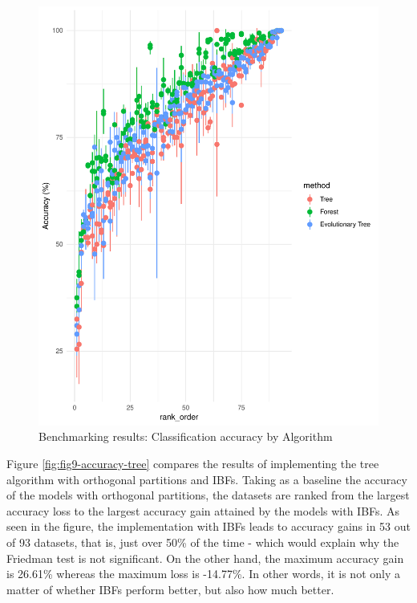 \documentclass[]{elsarticle} %
\makeatletter
\def\maxwidth{\ifdim\Gin@nat@width>\linewidth\linewidth
\else\Gin@nat@width\fi}
\let\Oldincludegraphics\includegraphics
\renewcommand{\includegraphics}[1]{\Oldincludegraphics[width=\maxwidth]{#1}}
\makeatother
\begin{document}
\begin{figure}
\centering
\includegraphics{Trees_with_Base_Functions_v3_files/figure-latex/fig8-performance-algorithm-results-1.pdf}
\caption{\label{fig:fig8-performance-algorithm-results}Benchmarking
results: Classification accuracy by Algorithm}
\end{figure}

Figure \ref{fig:fig9-accuracy-tree} compares the results of implementing
the tree algorithm with orthogonal partitions and IBFs. Taking as a
baseline the accuracy of the models with orthogonal partitions, the
datasets are ranked from the largest accuracy loss to the largest
accuracy gain attained by the models with IBFs. As seen in the figure,
the implementation with IBFs leads to accuracy gains in 53 out of 93
datasets, that is, just over 50\% of the time - which would explain why
the Friedman test is not significant. On the other hand, the maximum
accuracy gain is 26.61\% whereas the maximum loss is -14.77\%. In other
words, it is not only a matter of whether IBFs perform better, but also
how much better.
\end{document}
